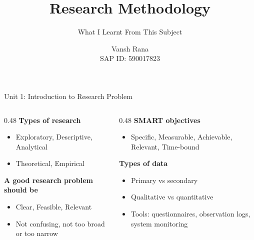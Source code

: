 \documentclass[aspectratio=169,10pt]{beamer}
\title{Research Methodology}
\subtitle{What I Learnt From This Subject}
\author[Vansh Rana (590017823)]{Vansh Rana\\ SAP ID: 590017823}
\institute{Submitted to: Dr. Tanupriya Choudhury}
\date{}
\begin{document}
\begin{frame}
\titlepage
\end{frame}

\begin{frame}{Unit 1: Introduction to Research Problem}
\begin{columns}[T]
\begin{column}{0.48\textwidth}
\textbf{Types of research}
\begin{itemize}
\item Exploratory, Descriptive, Analytical
\item Theoretical, Empirical
\end{itemize}
\medskip
\textbf{A good research problem should be}
\begin{itemize}
\item Clear, Feasible, Relevant
\item Not confusing, not too broad or too narrow
\end{itemize}
\end{column}
\begin{column}{0.48\textwidth}
\textbf{SMART objectives}
\begin{itemize}
\item Specific, Measurable, Achievable, Relevant, Time-bound
\end{itemize}
\medskip
\textbf{Types of data}
\begin{itemize}
\item Primary vs secondary
\item Qualitative vs quantitative
\item Tools: questionnaires, observation logs, system monitoring
\end{itemize}
\end{column}
\end{columns}
\end{frame}
\end{document}
